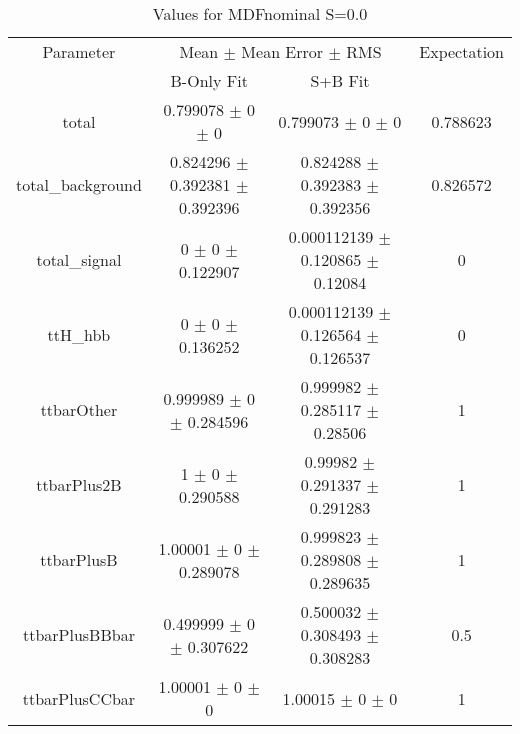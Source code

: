 \begin{table}
\centering
\caption{Values for MDFnominal S=0.0}
\begin{tabular}{cccc}
\toprule
Parameter & \multicolumn{2}{c}{Mean $\pm$ Mean Error $\pm$ RMS} & Expectation\\
 & B-Only Fit & S+B Fit & \\
\midrule
total & \num{0.799078} $\pm$ \num{0} $\pm$ \num{0} & \num{0.799073} $\pm$ \num{0} $\pm$ \num{0} & \num{0.788623}\\
total\_background & \num{0.824296} $\pm$ \num{0.392381} $\pm$ \num{0.392396} & \num{0.824288} $\pm$ \num{0.392383} $\pm$ \num{0.392356} & \num{0.826572}\\
total\_signal & \num{0} $\pm$ \num{0} $\pm$ \num{0.122907} & \num{0.000112139} $\pm$ \num{0.120865} $\pm$ \num{0.12084} & \num{0}\\
ttH\_hbb & \num{0} $\pm$ \num{0} $\pm$ \num{0.136252} & \num{0.000112139} $\pm$ \num{0.126564} $\pm$ \num{0.126537} & \num{0}\\
ttbarOther & \num{0.999989} $\pm$ \num{0} $\pm$ \num{0.284596} & \num{0.999982} $\pm$ \num{0.285117} $\pm$ \num{0.28506} & \num{1}\\
ttbarPlus2B & \num{1} $\pm$ \num{0} $\pm$ \num{0.290588} & \num{0.99982} $\pm$ \num{0.291337} $\pm$ \num{0.291283} & \num{1}\\
ttbarPlusB & \num{1.00001} $\pm$ \num{0} $\pm$ \num{0.289078} & \num{0.999823} $\pm$ \num{0.289808} $\pm$ \num{0.289635} & \num{1}\\
ttbarPlusBBbar & \num{0.499999} $\pm$ \num{0} $\pm$ \num{0.307622} & \num{0.500032} $\pm$ \num{0.308493} $\pm$ \num{0.308283} & \num{0.5}\\
ttbarPlusCCbar & \num{1.00001} $\pm$ \num{0} $\pm$ \num{0} & \num{1.00015} $\pm$ \num{0} $\pm$ \num{0} & \num{1}\\
\bottomrule
\end{tabular}
\end{table}